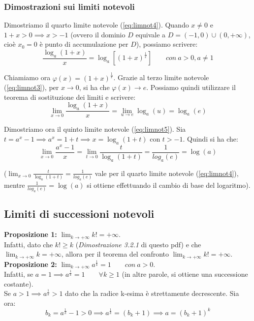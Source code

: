 \documentclass{article}
\begin{document}
\subsubsection{Dimostrazioni sui limiti notevoli}
\noindent Dimostriamo il quarto limite notevole (\ref{eq:limnot4}). Quando $x \neq 0$ e $1 + x > 0 \implies x > -1$ (ovvero il dominio $D$ equivale a $D = (-1, 0) \cup (0, +\infty)$, cioè $x_0 = 0$ è punto di accumulazione per $D$), possiamo scrivere:
\begin{equation*}
    \frac{\log_a(1 +x)}{x} = \log_a[(1 + x)^\frac{1}{x}] \qquad con \ a > 0, a \neq 1
\end{equation*}

\noindent Chiamiamo ora $\varphi(x) = (1 + x)^\frac{1}{x}$. Grazie al terzo limite notevole (\ref{eq:limnot3}), per $x \to 0$, si ha che $\varphi(x) \to e$. Possiamo quindi utilizzare il teorema di sostituzione dei limiti e scrivere:
\begin{equation*}
    \lim_{x \to 0} \frac{\log_a(1 + x)}{x} = \lim_{u \to e} \log_a(u) = \log_a(e)
\end{equation*}

\noindent Dimostriamo ora il quinto limite notevole (\ref{eq:limnot5}). Sia $t = a^x - 1 \implies a^x = 1 + t \implies x = \log_a(1 + t)$ con $t > -1$. Quindi si ha che:
\begin{equation*}
    \lim_{x \to 0} \frac{a^x - 1}{x} = \lim_{t \to 0} \frac{t}{\log_a(1 + t)} = \frac{1}{log_a(e)} = \log(a)
\end{equation*}

\noindent ($\lim_{x \to 0} \frac{t}{\log_a(1 + t)} = \frac{1}{log_a(e)}$ vale per il quarto limite notevole (\ref{eq:limnot4}), mentre $\frac{1}{log_a(e)} = \log(a)$ si ottiene effettuando il cambio di base del logaritmo).

\subsection{Limiti di successioni notevoli}
\textbf{Proposizione 1:} $\lim_{k \to +\infty} k! = +\infty$.\\
Infatti, dato che $k! \geq k$ (\textit{Dimostrazione 3.2.1} di questo pdf) e che $\lim_{k \to +\infty} k = +\infty$, allora per il teorema del confronto $\lim_{k \to +\infty} k! = +\infty$.\\

\noindent\textbf{Proposizione 2:} $\lim_{k \to +\infty} a^\frac{1}{k} = 1 \qquad con \ a > 0$.\\
Infatti, se $a = 1 \implies a^\frac{1}{k} = 1 \qquad \forall k \geq 1$ (in altre parole, si ottiene una successione costante).\\
Se $a > 1 \implies a^\frac{1}{k} > 1$ dato che la radice k-esima è strettamente decrescente. Sia ora:
\begin{equation*}
    b_k = a^\frac{1}{k} - 1 > 0 \implies a^\frac{1}{k} = (b_k + 1) \implies a = (b_k + 1)^k
\end{equation*}
\end{document}
